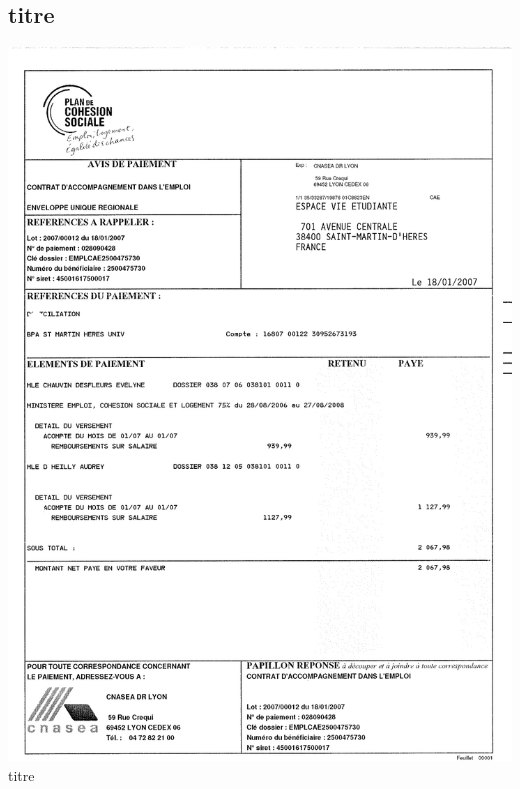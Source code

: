 \subsection{titre}
\begin{center}
\includegraphics[scale=0.6]{annexes/images/bonne_question.pdf} \\
titre
\end{center}
